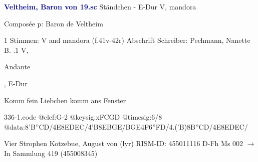\documentclass[twocolumn]{book}
\begin{document}
\newline \par \vspace{7pt} \textcolor{darkblue}{\textbf{Veltheim, Baron von  19.sc}}
\newline Ständchen - E-Dur
\newline V, mandora
\newline \begin{itshape}[heading, f.41v:] Composée p: Baron de Veltheim\end{itshape} 
\newline \textcolor{darkblue}{}  1 Stimmen: V and mandora  (f.41v-42r)
\newline Abschrift
\newline Schreiber: Pechmann, Nanette B.
.1  V, \begin{itshape}Andante\end{itshape}, E-Dur
\newline \begin{footnotesize} Komm fein Liebchen komm ans Fenster \end{footnotesize}  
\begin{filecontents*}{336-1.code}
@clef:G-2
@keysig:xFCGD
@timesig:6/8
@data:{8'B''C}D/4E8E{DE}C/4'B8E{BG}E/{BG}E4F{6''FD}/4.('B){8B''C}D/4E8E{DE}C/
\end{filecontents*}
\newline
%
\newline Vier Strophen
\newline Kotzebue, August von  (lyr)
\newline RISM-ID: 455011116
\newline D-Fh  Ms 002
\newline $\rightarrow$ In Sammlung 419 (455008345)
      
\end{document}
